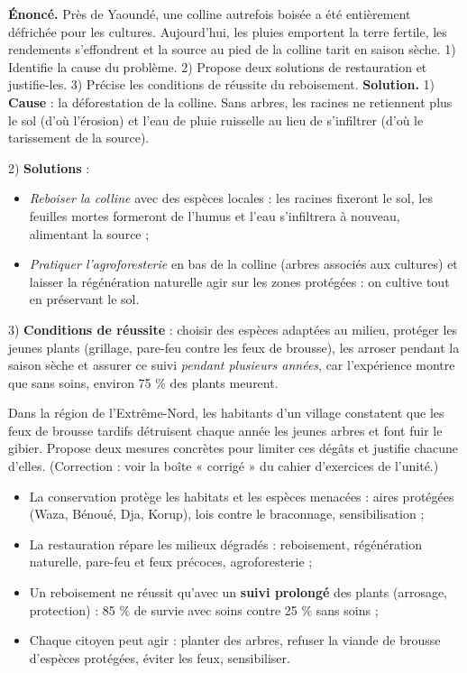 \documentclass[11pt]{article}
\newcommand{\cle}[1]{{\popxbold\color{popdark}#1}}
\begin{document}
\begin{exoresolu}
\textbf{Énoncé.} Près de Yaoundé, une colline autrefois boisée a été entièrement défrichée pour les cultures. Aujourd'hui, les pluies emportent la terre fertile, les rendements s'effondrent et la source au pied de la colline tarit en saison sèche. 1) Identifie la cause du problème. 2) Propose deux solutions de restauration et justifie-les. 3) Précise les conditions de réussite du reboisement.
\tcblower
\textbf{Solution.}
1) \textbf{Cause} : la déforestation de la colline. Sans arbres, les racines ne retiennent plus le sol (d'où l'érosion) et l'eau de pluie ruisselle au lieu de s'infiltrer (d'où le tarissement de la source).

2) \textbf{Solutions} :
\begin{itemize}
\item \emph{Reboiser la colline} avec des espèces locales : les racines fixeront le sol, les feuilles mortes formeront de l'humus et l'eau s'infiltrera à nouveau, alimentant la source ;
\item \emph{Pratiquer l'agroforesterie} en bas de la colline (arbres associés aux cultures) et laisser la régénération naturelle agir sur les zones protégées : on cultive tout en préservant le sol.
\end{itemize}

3) \textbf{Conditions de réussite} : choisir des espèces adaptées au milieu, protéger les jeunes plants (grillage, pare-feu contre les feux de brousse), les arroser pendant la saison sèche et assurer ce suivi \emph{pendant plusieurs années}, car l'expérience montre que sans soins, environ 75 \% des plants meurent.
\end{exoresolu}

\begin{exercice}
Dans la région de l'Extrême-Nord, les habitants d'un village constatent que les feux de brousse tardifs détruisent chaque année les jeunes arbres et font fuir le gibier. Propose deux mesures concrètes pour limiter ces dégâts et justifie chacune d'elles. (Correction : voir la boîte « corrigé » du cahier d'exercices de l'unité.)
\end{exercice}

\begin{aretenir}
\begin{itemize}
\item La \cle{conservation} protège les habitats et les espèces menacées : aires protégées (Waza, Bénoué, Dja, Korup), lois contre le braconnage, sensibilisation ;
\item La \cle{restauration} répare les milieux dégradés : reboisement, régénération naturelle, pare-feu et feux précoces, agroforesterie ;
\item Un reboisement ne réussit qu'avec un \textbf{suivi prolongé} des plants (arrosage, protection) : 85 \% de survie avec soins contre 25 \% sans soins ;
\item Chaque citoyen peut agir : planter des arbres, refuser la viande de brousse d'espèces protégées, éviter les feux, sensibiliser.
\end{itemize}
\end{aretenir}
\end{document}
